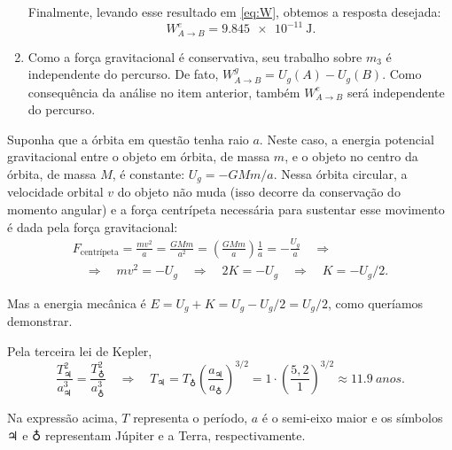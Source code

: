 \documentclass[a4paper]{article}
\newcommand\myrightarrow{\quad\Rightarrow\quad}
\begin{document}
\begin{resolucoes}
\begin{exercicio}
\begin{enumerate}
  Finalmente, levando esse resultado em \eqref{eq:W}, obtemos a resposta desejada:
  \begin{equation*}
  W_{A\to B}^{e} = \SI{9.845e-11}{\joule}.
  \end{equation*}
  
  

  \item Como a força gravitacional é conservativa, seu trabalho sobre $m_3$ é independente do percurso.
  De fato, $W_{A\to B}^{g} = U_g(A) - U_g(B)$.
  Como consequência da análise no item anterior, também $W_{A\to B}^{e}$ será independente do percurso.
  \end{enumerate}
  \end{exercicio}

  \begin{exercicio}
   Suponha que a órbita em questão tenha raio $a$.
  Neste caso, a energia potencial gravitacional entre o objeto em órbita, de massa $m$, e o objeto no centro da órbita, de massa $M$, é constante: $U_g = -GMm/a$.  
  Nessa órbita circular, a velocidade orbital $v$ do objeto não muda (isso decorre da conservação do momento angular) e a força centrípeta necessária para sustentar esse movimento é dada pela força gravitacional:
  \begin{gather*}
  F_{\text{centrípeta}} = \frac{mv^2}{a} = \frac{GMm}{a^2} = \left(\frac{GMm}{a}\right)\frac{1}{a} = -\frac{U_g}{a} \myrightarrow\\
  \myrightarrow mv^2= -U_g \myrightarrow 2K = -U_g \myrightarrow K = -U_g/2.
  \end{gather*}
  
  Mas a energia mecânica é $E = U_g + K = U_g - U_g/2 = U_g/2$, como queríamos demonstrar.
  \end{exercicio}
  
  \begin{exercicio}
   Pela terceira lei de Kepler,
  \begin{equation*}
  \frac{T_{\jupiter}^2}{a_{\jupiter}^3} = \frac{T_{\earth}^2}{a_{\earth}^3} \myrightarrow T_{\jupiter} = T_{\earth} \left(\frac{a_{\jupiter}}{a_{\earth}}\right)^{3/2} = 1 \cdot \left(\frac{5,2}{1}\right)^{3/2} \approx \SI{11.9}{anos}.
  \end{equation*}
  
  Na expressão acima, $T$ representa o período, $a$ é o semi-eixo maior e os símbolos $\jupiter$ e $\earth$ representam Júpiter e a Terra, respectivamente.
  \end{exercicio}
  

\end{resolucoes}
\end{document}
